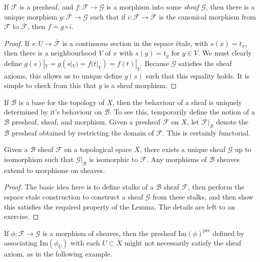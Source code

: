 \begin{theorem}
    If $\mathcal{F}$ is a presheaf, and $f: \mathcal{F} \to \mathcal{G}$ is a morphism into some {\it sheaf} $\mathcal{G}$, then there is a unique morphism $g: \overline{\mathcal{F}} \to \mathcal{G}$ such that if $i: \mathcal{F} \to \overline{\mathcal{F}}$ is the canonical morphism from $\mathcal{F}$ to $\overline{\mathcal{F}}$, then $f = g \circ i$.
\end{theorem}
\begin{proof}
    If $s: U \to \overline{\mathcal{F}}$ is a continuous section in the espace \'{e}tale, with $s(x) = t_x$, then there is a neighbourhood $V$ of $x$ with $s(y) = t_y$ for $y \in V$. We must clearly define $g(s)|_V = g(s|_V) = f(t|_V) = f(t)|_V$. Because $\mathcal{G}$ satisfies the sheaf axioms, this allows us to unique define $g(s)$ such that this equality holds. It is simple to check from this that $g$ is a sheaf morphism.
\end{proof}

If $\mathcal{B}$ is a base for the topology of $X$, then the behaviour of a sheaf is uniquely determined by it's behaviour on $\mathcal{B}$. To see this, temporarily define the notion of a $\mathcal{B}$ presheaf, sheaf, and morphism. Given a presheaf $\mathcal{F}$ on $X$, let $\mathcal{F}|_{\mathcal{B}}$ denote the $\mathcal{B}$ presheaf obtained by restricting the domain of $\mathcal{F}$. This is certainly functorial.

\begin{lemma}
    Given a $\mathcal{B}$ sheaf $\mathcal{F}$ on a topological space $X$, there exists a unique sheaf $\mathcal{G}$ up to isomorphism such that $\mathcal{G}|_{\mathcal{B}}$ is isomorphic to $\mathcal{F}$. Any morphisms of $\mathcal{B}$ sheaves extend to morphisms on sheaves.
\end{lemma}
\begin{proof}
    The basic idea here is to define stalks of a $\mathcal{B}$ sheaf $\mathcal{F}$, then perform the espace etale construction to construct a sheaf $\mathcal{G}$ from these stalks, and then show this satisfies the required property of the Lemma. The details are left to an exercise.
\end{proof}

If $\phi: \mathcal{F} \to \mathcal{G}$ is a morphism of sheaves, then the presheaf $\text{Im}(\phi)^{\text{pre}}$ defined by associating $\text{Im}(\phi_U)$ with each $U \subset X$ might not necessarily satisfy the sheaf axiom, as in the following example.


